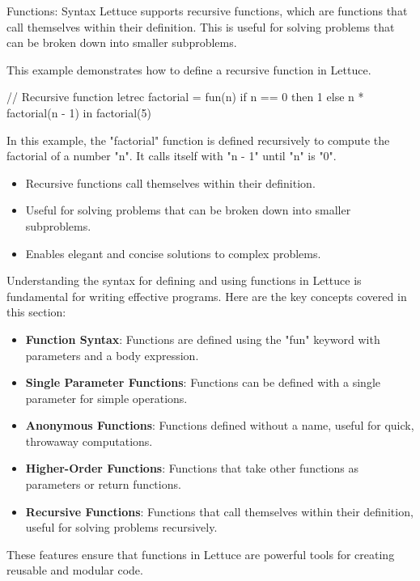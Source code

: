 \begin{notes}{Functions: Syntax}
    Lettuce supports recursive functions, which are functions that call themselves within their definition. This is useful for solving problems that can be broken down into smaller subproblems.
    
    \begin{highlight}
    
        This example demonstrates how to define a recursive function in Lettuce.
    
    \begin{code}[Lettuce]
    // Recursive function
    letrec factorial = fun(n) {
        if n == 0 then 1 else n * factorial(n - 1)
    } in
    factorial(5)
    \end{code}
    
        In this example, the "factorial" function is defined recursively to compute the factorial of a number "n". It calls itself with "n - 1" until "n" is "0".
    
        \begin{itemize}
            \item Recursive functions call themselves within their definition.
            \item Useful for solving problems that can be broken down into smaller subproblems.
            \item Enables elegant and concise solutions to complex problems.
        \end{itemize}
    
    \end{highlight}
    
    \begin{highlight}
    
        Understanding the syntax for defining and using functions in Lettuce is fundamental for writing effective programs. Here are the key concepts covered in this section:
    
        \begin{itemize}
            \item \textbf{Function Syntax}: Functions are defined using the "fun" keyword with parameters and a body expression.
            \item \textbf{Single Parameter Functions}: Functions can be defined with a single parameter for simple operations.
            \item \textbf{Anonymous Functions}: Functions defined without a name, useful for quick, throwaway computations.
            \item \textbf{Higher-Order Functions}: Functions that take other functions as parameters or return functions.
            \item \textbf{Recursive Functions}: Functions that call themselves within their definition, useful for solving problems recursively.
        \end{itemize}
    
        These features ensure that functions in Lettuce are powerful tools for creating reusable and modular code.
    
    \end{highlight}
\end{notes}

